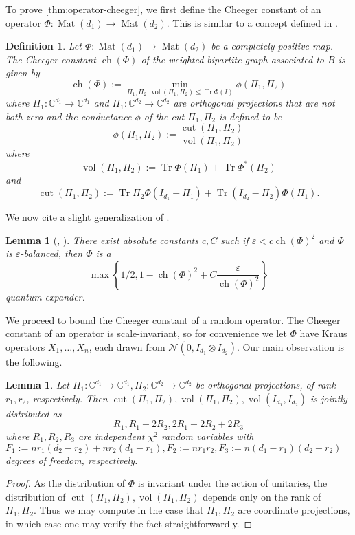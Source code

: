 \documentclass{article}
\newtheorem{lemma}[theorem]{Lemma}
\newtheorem{definition}{Definition}
\newcommand{\C}{{\mathbb{C}}}
\newcommand{\ot}{\otimes}
\newcommand{\mat}{\operatorname{Mat}}
\newcommand{\ch}{\operatorname{ch}}
\newcommand{\cut}{\operatorname{cut}}
\newcommand{\vol}{\operatorname{vol}}
\newcommand\eps{\varepsilon}
\newcommand\cN{\mathcal{N}}
\newcommand\tr{\operatorname{Tr}}
\begin{document}
To prove \cref{thm:operator-cheeger}, we first define the Cheeger constant of an operator $\Phi:\mat(d_1) \to \mat(d_2)$. This is similar to a concept defined in \cite{H07}.
\begin{definition}
Let $\Phi : \mat(d_1) \to \mat(d_2)$ be a completely positive map. The Cheeger constant $\ch(\Phi)$ of the weighted bipartite graph associated to $B$ is given by
$$\ch(\Phi):=\min_{\Pi_1, \Pi_2: \vol(\Pi_1, \Pi_2) \leq \tr \Phi(I)} \phi(\Pi_1,\Pi_2)$$
where $\Pi_1: \C^{d_1} \to \C^{d_1}$ and $\Pi_1: \C^{d_2} \to \C^{d_2}$ are orthogonal projections that are not both zero and the \emph{conductance} $\phi$ of the cut $\Pi_1, \Pi_2$ is defined to be
$$\phi(\Pi_1,\Pi_2) := \frac{\cut(\Pi_1, \Pi_2)}{\vol(\Pi_1,\Pi_2)}$$
where
$$ \vol(\Pi_1,\Pi_2):=
\tr \Phi(\Pi_1) + \tr \Phi^*(\Pi_2)$$
and $$ \cut(\Pi_1, \Pi_2):= \tr \Pi_2 \Phi(I_{d_1} - \Pi_1) + \tr (I_{d_2} - \Pi_2) \Phi(\Pi_1).$$
\end{definition}

We now cite a slight generalization of \cite{FM20}.

\begin{lemma} [\cite{FM20}, \cite{KLR19}]\label{lem:op-cheeger} There exist absolute constants $c, C$ such if $\eps < c \ch(\Phi)^2$ and $\Phi$ is $\eps$-balanced, then $\Phi$ is a
$$ \max\left\{1/2, 1 -  \ch(\Phi)^2 + C \frac{\eps}{\ch(\Phi)^2} \right\}$$
quantum expander.
\end{lemma}
We proceed to bound the Cheeger constant of a random operator. The Cheeger constant of an operator is scale-invariant, so for convenience we let $\Phi$ have Kraus operators $X_1, \dots, X_n$, each drawn from $\cN(0,  I_{d_1} \ot I_{d_2}).$ Our main observation is the following.

\begin{lemma}\label{fact:chi} Let $\Pi_1:\C^{d_1} \to \C^{d_1}, \Pi_2: \C^{d_2} \to \C^{d_2}$ be orthogonal projections, of rank $r_1, r_2$, respectively. Then $\cut(\Pi_1, \Pi_2), \vol(\Pi_1, \Pi_2), \vol(I_{d_1}, I_{d_2})$ is jointly distributed as
$$ R_1, R_1 + 2R_2, 2R_1 + 2 R_2 + 2R_3$$ where
$R_1, R_2, R_3$ are independent $\chi^2$ random variables with $F_1:=n r_1(d_2 - r_2) + n r_2(d_1-r_1), F_2:= n r_1r_2, F_3:= n(d_1 - r_1)(d_2 - r_2)$ degrees of freedom, respectively.
\end{lemma}
\begin{proof} As the distribution of $\Phi$ is invariant under the action of unitaries, the distribution of $\cut(\Pi_1, \Pi_2), \vol(\Pi_1, \Pi_2)$ depends only on the rank of $\Pi_1, \Pi_2$. Thus we may compute in the case that $\Pi_1, \Pi_2$ are coordinate projections, in which case one may verify the fact straightforwardly.
\end{proof}
\end{document}
